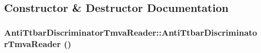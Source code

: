 \subsection{Constructor \& Destructor Documentation}
\hypertarget{classAntiTtbarDiscriminatorTmvaReader_a904c009bb180d246e5d0fd4814d014fa}{
\subsubsection[{AntiTtbarDiscriminatorTmvaReader}]{\setlength{\rightskip}{0pt plus 5cm}AntiTtbarDiscriminatorTmvaReader::AntiTtbarDiscriminatorTmvaReader ()}}
\label{classAntiTtbarDiscriminatorTmvaReader_a904c009bb180d246e5d0fd4814d014fa}


